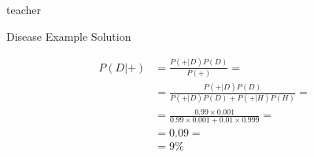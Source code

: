 \begin{shownto}{teacher}
\begin{frame}{Disease Example Solution}

    \begin{align*}
    P(D|+)  &= \frac{P(+|D)P(D)}{P(+)} = \\
            &= \frac{P(+|D)P(D)}{P(+|D)P(D) + P(+|H)P(H)} = \\
            &= \frac{0.99 \times 0.001}{0.99 \times 0.001 + 0.01 \times 0.999}= \\
            &= 0.09 =\\
            &= 9\% \\
    \end{align*}

\end{frame}
\end{shownto}

